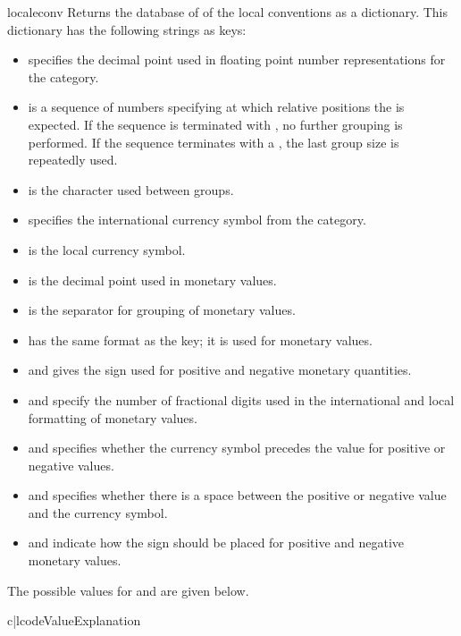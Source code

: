 \begin{funcdesc}{localeconv}{}
Returns the database of of the local conventions as a dictionary. This
dictionary has the following strings as keys:
\begin{itemize}
\item {} specifies the decimal point used in
floating point number representations for the 
category.
\item {} is a sequence of numbers specifying at which
relative positions the  is expected. If the
sequence is terminated with , no further
grouping is performed. If the sequence terminates with a , the last
group size is repeatedly used.
\item {} is the character used between groups.
\item {} specifies the international currency
symbol from the  category.
\item {} is the local currency symbol.
\item {} is the decimal point used in monetary
values.
\item {} is the separator for grouping of
monetary values.
\item {} has the same format as the 
key; it is used for monetary values.
\item {} and  gives the sign
used for positive and negative monetary quantities.
\item {} and  specify the number
of fractional digits used in the international and local formatting
of monetary values.
\item {} and  specifies whether
the currency symbol precedes the value for positive or negative
values.
\item {} and  specifies
whether there is a space between the positive or negative value and
the currency symbol.
\item {} and  indicate how the
sign should be placed for positive and negative monetary values. 
\end{itemize}

The possible values for  and
 are given below.

\begin{tableii}{c|l}{code}{Value}{Explanation}
\end{tableii}
\end{funcdesc}

